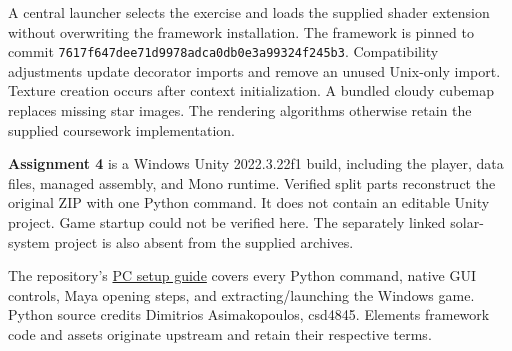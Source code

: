 \documentclass[10pt,a4paper]{article}
\begin{document}
A central launcher selects the exercise and loads the supplied shader extension without overwriting the framework installation. The framework is pinned to commit \texttt{7617f647dee71d9978adca0db0e3a99324f245b3}. Compatibility adjustments update decorator imports and remove an unused Unix-only import. Texture creation occurs after context initialization. A bundled cloudy cubemap replaces missing star images. The rendering algorithms otherwise retain the supplied coursework implementation.

\textbf{Assignment 4} is a Windows Unity 2022.3.22f1 build, including the player, data files, managed assembly, and Mono runtime. Verified split parts reconstruct the original ZIP with one Python command. It does not contain an editable Unity project. Game startup could not be verified here. The separately linked solar-system project is also absent from the supplied archives.

The repository's \href{https://github.com/mitsosasim/graphics_uoc/blob/main/docs/SETUP.md}{PC setup guide} covers every Python command, native GUI controls, Maya opening steps, and extracting/launching the Windows game. Python source credits Dimitrios Asimakopoulos, csd4845. Elements framework code and assets originate upstream and retain their respective terms.
\end{document}
